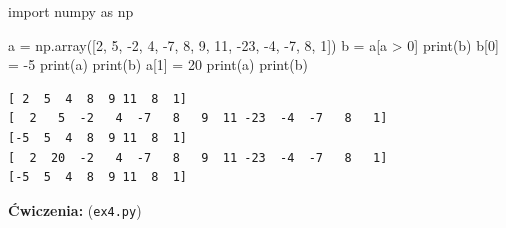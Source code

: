 \documentclass[
  letterpaper,
  DIV=11,
  numbers=noendperiod]{scrreprt}
\newenvironment{Shaded}{\begin{snugshade}}{\end{snugshade}}
\newcommand{\BuiltInTok}[1]{\textcolor[rgb]{0.00,0.23,0.31}{#1}}
\newcommand{\DecValTok}[1]{\textcolor[rgb]{0.68,0.00,0.00}{#1}}
\newcommand{\ImportTok}[1]{\textcolor[rgb]{0.00,0.46,0.62}{#1}}
\newcommand{\NormalTok}[1]{\textcolor[rgb]{0.00,0.23,0.31}{#1}}
\newcommand{\OperatorTok}[1]{\textcolor[rgb]{0.37,0.37,0.37}{#1}}
\begin{document}
\begin{Shaded}
\begin{Highlighting}[]
\ImportTok{import}\NormalTok{ numpy }\ImportTok{as}\NormalTok{ np}

\NormalTok{a }\OperatorTok{=}\NormalTok{ np.array([}\DecValTok{2}\NormalTok{, }\DecValTok{5}\NormalTok{, }\OperatorTok{{-}}\DecValTok{2}\NormalTok{, }\DecValTok{4}\NormalTok{, }\OperatorTok{{-}}\DecValTok{7}\NormalTok{, }\DecValTok{8}\NormalTok{, }\DecValTok{9}\NormalTok{, }\DecValTok{11}\NormalTok{, }\OperatorTok{{-}}\DecValTok{23}\NormalTok{, }\OperatorTok{{-}}\DecValTok{4}\NormalTok{, }\OperatorTok{{-}}\DecValTok{7}\NormalTok{, }\DecValTok{8}\NormalTok{, }\DecValTok{1}\NormalTok{])}
\NormalTok{b }\OperatorTok{=}\NormalTok{ a[a }\OperatorTok{\textgreater{}} \DecValTok{0}\NormalTok{]}
\BuiltInTok{print}\NormalTok{(b)}
\NormalTok{b[}\DecValTok{0}\NormalTok{] }\OperatorTok{=} \OperatorTok{{-}}\DecValTok{5}
\BuiltInTok{print}\NormalTok{(a)}
\BuiltInTok{print}\NormalTok{(b)}
\NormalTok{a[}\DecValTok{1}\NormalTok{] }\OperatorTok{=} \DecValTok{20}
\BuiltInTok{print}\NormalTok{(a)}
\BuiltInTok{print}\NormalTok{(b)}
\end{Highlighting}
\end{Shaded}

\begin{verbatim}
[ 2  5  4  8  9 11  8  1]
[  2   5  -2   4  -7   8   9  11 -23  -4  -7   8   1]
[-5  5  4  8  9 11  8  1]
[  2  20  -2   4  -7   8   9  11 -23  -4  -7   8   1]
[-5  5  4  8  9 11  8  1]
\end{verbatim}

\textbf{Ćwiczenia:} (\texttt{ex4.py})
\end{document}
